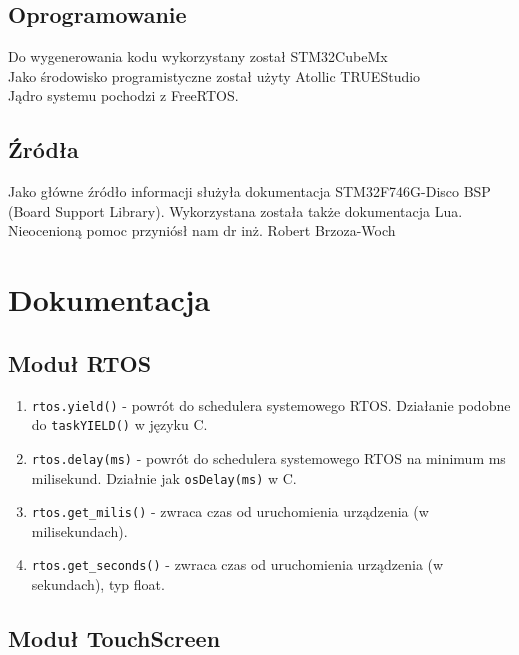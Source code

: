 \documentclass{article}
\begin{document}
\subsection{Oprogramowanie}

Do wygenerowania kodu wykorzystany został STM32CubeMx\\ 
Jako środowisko programistyczne został użyty Atollic TRUEStudio\\             
Jądro systemu pochodzi z FreeRTOS.

\subsection{Źródła}

Jako główne źródło informacji służyła dokumentacja STM32F746G-Disco BSP (Board Support Library). Wykorzystana została także dokumentacja 
Lua.\\
Nieocenioną pomoc przyniósł nam dr inż. Robert Brzoza-Woch

\newpage

\section{Dokumentacja}

\subsection{Moduł RTOS}

\begin{enumerate}
  \item \texttt{rtos.yield()} - powrót do schedulera systemowego RTOS. Działanie podobne do \texttt{taskYIELD()} w języku C.
  \item \texttt{rtos.delay(ms)} - powrót do schedulera systemowego RTOS na minimum ms milisekund. Działnie jak \texttt{osDelay(ms)} w C.
  \item \texttt{rtos.get\_milis()} - zwraca czas od uruchomienia urządzenia (w milisekundach).
  \item \texttt{rtos.get\_seconds()} - zwraca czas od uruchomienia urządzenia (w sekundach), typ float.
\end{enumerate}

\subsection{Moduł TouchScreen}
\end{document}
